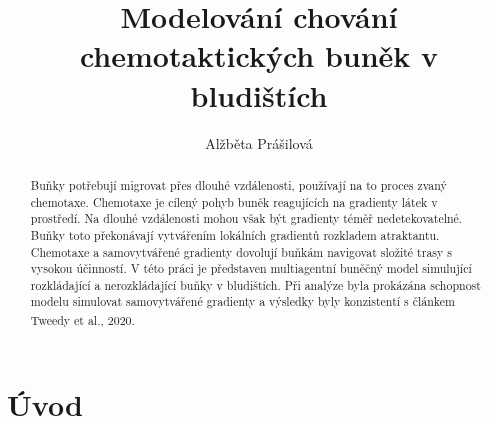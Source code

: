 \documentclass[10pt,a4paper,twocolumn]{article}
\begin{document}
\providecommand{\ShortAuthorList}[0]{Alžběta Prášilová}
\title{Modelování chování chemotaktických buněk v bludištích}
\author[1,*]{Alžběta Prášilová}

\date{\dateline{}}

\begin{abstract}
\noindent
Buňky potřebují migrovat přes dlouhé vzdálenosti, používají na to proces zvaný chemotaxe. Chemotaxe je cílený pohyb buněk reagujících na
gradienty látek v prostředí. Na dlouhé vzdálenosti mohou však být gradienty téměř nedetekovatelné.
Buňky toto překonávají vytvářením lokálních gradientů rozkladem atraktantu. Chemotaxe a samovytvářené gradienty dovolují buňkám
navigovat složité trasy s vysokou účinností. V této práci je představen multiagentní buněčný model simulující rozkládající a nerozkládající buňky v bludištích. Při analýze byla prokázána schopnost modelu simulovat samovytvářené gradienty a výsledky byly konzistentí s článkem Tweedy et al., 2020\textsuperscript{\cite{h-model}}.



\DOI{} %
\end{abstract}

\maketitle
\thispagestyle{titlestyle}



\section{Úvod}
\end{document}
